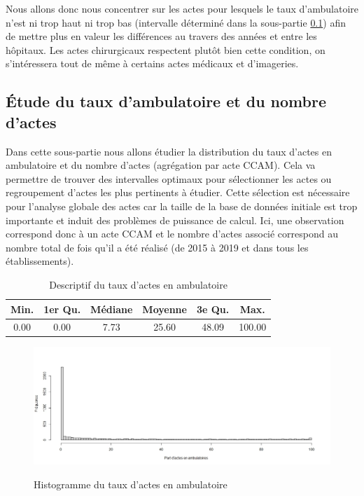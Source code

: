 \newpage


Nous allons donc nous concentrer sur les actes pour lesquels le taux d'ambulatoire n'est ni trop haut ni trop bas (intervalle déterminé dans la sous-partie \ref{intervalle}) afin de mettre plus en valeur les différences au travers des années et entre les hôpitaux. Les actes chirurgicaux respectent plutôt bien cette condition, on s'intéressera tout de même à certains actes médicaux et d'imageries. 


\subsection{\'{E}tude du taux d'ambulatoire et du nombre d'actes} \label{intervalle}


Dans cette sous-partie nous allons étudier la distribution du taux d'actes en ambulatoire et du nombre d'actes (agrégation par acte CCAM). Cela va permettre de trouver des intervalles optimaux pour sélectionner les actes ou regroupement d'actes les plus pertinents à étudier. Cette sélection est nécessaire pour l'analyse globale des actes car la taille de la base de données initiale est trop importante et induit des problèmes de puissance de calcul. Ici, une observation correspond donc à un acte CCAM et le nombre d'actes associé correspond au nombre total de fois qu'il a été réalisé (de 2015 à 2019 et dans tous les établissements).


\begin{table}[ht]
\centering
\caption{Descriptif du taux d'actes en ambulatoire} 
\begin{tabular}{cccccc}
  \hline
Min. & 1er Qu. & Médiane & Moyenne & 3e Qu. & Max. \\ 
  \hline
0.00 & 0.00 & 7.73 & 25.60 & 48.09 & 100.00 \\ 
   \hline
\end{tabular}
\end{table}



\begin{figure}[!ht]
    \centering
    \caption{Histogramme du taux d'actes en ambulatoire}
    \includegraphics[scale=0.55]{Images/hist_part_ambu.jpeg}
    \label{hist_part_ambu}
\end{figure}

